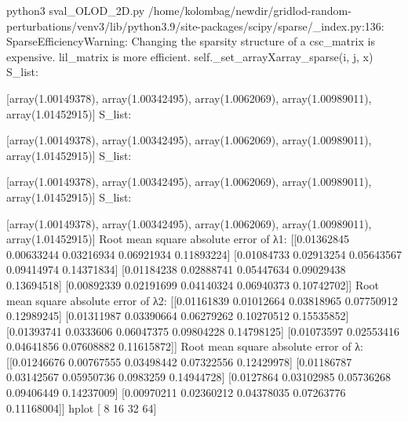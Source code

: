 python3 sval_OLOD_2D.py
/home/kolombag/newdir/gridlod-random-perturbations/venv3/lib/python3.9/site-packages/scipy/sparse/_index.py:136: SparseEfficiencyWarning: Changing the sparsity structure of a csc_matrix is expensive. lil_matrix is more efficient.
  self._set_arrayXarray_sparse(i, j, x)
S_list:

[array(1.00149378), array(1.00342495), array(1.0062069), array(1.00989011), array(1.01452915)]
S_list:

[array(1.00149378), array(1.00342495), array(1.0062069), array(1.00989011), array(1.01452915)]
S_list:

[array(1.00149378), array(1.00342495), array(1.0062069), array(1.00989011), array(1.01452915)]
S_list:

[array(1.00149378), array(1.00342495), array(1.0062069), array(1.00989011), array(1.01452915)]
Root mean square absolute error of λ1:
 [[0.01362845 0.00633244 0.03216934 0.06921934 0.11893224]
 [0.01084733 0.02913254 0.05643567 0.09414974 0.14371834]
 [0.01184238 0.02888741 0.05447634 0.09029438 0.13694518]
 [0.00892339 0.02191699 0.04140324 0.06940373 0.10742702]]
Root mean square absolute error of λ2: 
 [[0.01161839 0.01012664 0.03818965 0.07750912 0.12989245]
 [0.01311987 0.03390664 0.06279262 0.10270512 0.15535852]
 [0.01393741 0.0333606  0.06047375 0.09804228 0.14798125]
 [0.01073597 0.02553416 0.04641856 0.07608882 0.11615872]]
Root mean square absolute error of λ: 
 [[0.01246676 0.00767555 0.03498442 0.07322556 0.12429978]
 [0.01186787 0.03142567 0.05950736 0.0983259  0.14944728]
 [0.0127864  0.03102985 0.05736268 0.09406449 0.14237009]
 [0.00970211 0.02360212 0.04378035 0.07263776 0.11168004]]
hplot [ 8 16 32 64]